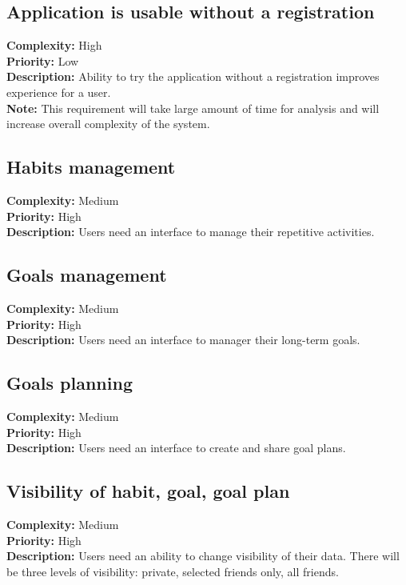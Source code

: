 \subsection{Application is usable without a registration}\label{subsec:application-is-usable-without-registration}
\textbf{Complexity:} High\\
\textbf{Priority:} Low\\
\textbf{Description:} Ability to try the application without a registration improves experience for a user.\\
\textbf{Note:} This requirement will take large amount of time for analysis and will increase overall complexity of the system.\\


\subsection{Habits management}\label{subsec:habits-management}
\textbf{Complexity:} Medium\\
\textbf{Priority:} High\\
\textbf{Description:} Users need an interface to manage their repetitive activities.\\


\subsection{Goals management}\label{subsec:goals-management}
\textbf{Complexity:} Medium\\
\textbf{Priority:} High\\
\textbf{Description:} Users need an interface to manager their long-term goals.\\


\subsection{Goals planning}\label{subsec:goals-planning}
\textbf{Complexity:} Medium\\
\textbf{Priority:} High\\
\textbf{Description:} Users need an interface to create and share goal plans.\\


\subsection{Visibility of habit, goal, goal plan}\label{subsec:visibility-for-habit-goal-goal-plan}
\textbf{Complexity:} Medium\\
\textbf{Priority:} High\\
\textbf{Description:} Users need an ability to change visibility of their data.
There will be three levels of visibility: private, selected friends only, all friends.\\


